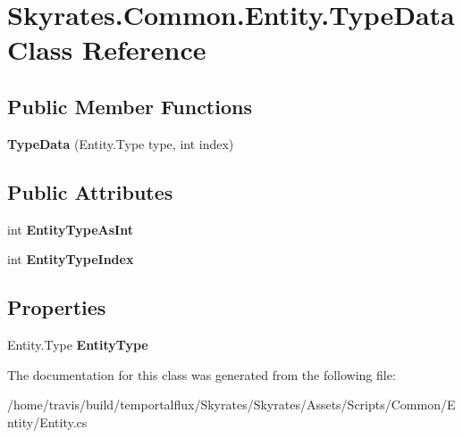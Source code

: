 \hypertarget{class_skyrates_1_1_common_1_1_entity_1_1_type_data}{\section{Skyrates.\-Common.\-Entity.\-Type\-Data Class Reference}
\label{class_skyrates_1_1_common_1_1_entity_1_1_type_data}
}
\subsection*{Public Member Functions}
\begin{DoxyCompactItemize}
\item 
\hypertarget{class_skyrates_1_1_common_1_1_entity_1_1_type_data_ad9474a7834d94350b8c2298a51efb201}{{\bfseries Type\-Data} (Entity.\-Type type, int index)}\label{class_skyrates_1_1_common_1_1_entity_1_1_type_data_ad9474a7834d94350b8c2298a51efb201}

\end{DoxyCompactItemize}
\subsection*{Public Attributes}
\begin{DoxyCompactItemize}
\item 
\hypertarget{class_skyrates_1_1_common_1_1_entity_1_1_type_data_a4211076c90763ba3b27ba18c754b6e6a}{int {\bfseries Entity\-Type\-As\-Int}}\label{class_skyrates_1_1_common_1_1_entity_1_1_type_data_a4211076c90763ba3b27ba18c754b6e6a}

\item 
\hypertarget{class_skyrates_1_1_common_1_1_entity_1_1_type_data_ace557ef29e881b0354f43a8270cc3cd7}{int {\bfseries Entity\-Type\-Index}}\label{class_skyrates_1_1_common_1_1_entity_1_1_type_data_ace557ef29e881b0354f43a8270cc3cd7}

\end{DoxyCompactItemize}
\subsection*{Properties}
\begin{DoxyCompactItemize}
\item 
\hypertarget{class_skyrates_1_1_common_1_1_entity_1_1_type_data_abd58fe0c39ae4802ba061c4fa06136f2}{Entity.\-Type {\bfseries Entity\-Type}}\label{class_skyrates_1_1_common_1_1_entity_1_1_type_data_abd58fe0c39ae4802ba061c4fa06136f2}

\end{DoxyCompactItemize}


The documentation for this class was generated from the following file\-:\begin{DoxyCompactItemize}
\item 
/home/travis/build/temportalflux/\-Skyrates/\-Skyrates/\-Assets/\-Scripts/\-Common/\-Entity/Entity.\-cs\end{DoxyCompactItemize}
